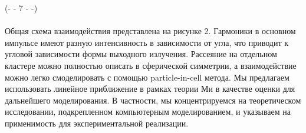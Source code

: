 \noindent(- - 7 - -)\\~\\
Общая схема взаимодействия представлена на рисунке 2. Гармоники в основном импульсе имеют разную интенсивность в зависимости от угла, что приводит к угловой зависимости формы выходного излучения. Рассеяние на отдельном кластере можно полностью описать в сферической симметрии, а взаимодействие можно легко смоделировать с помощью particle-in-cell метода. Мы предлагаем использовать линейное приближение в рамках теории Ми в качестве оценки для дальнейшего моделирования. В частности, мы концентрируемся на теоретическом исследовании, подкрепленном компьютерным моделированием, и указываем на применимость для экспериментальной реализации.
